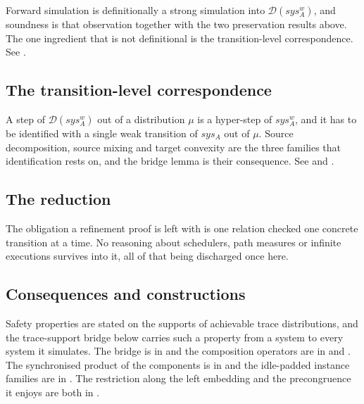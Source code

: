 Forward simulation is definitionally a strong simulation into $\mathcal{D}(sys_A^w)$, and soundness is that observation together with the two preservation results above.
The one ingredient that is not definitional is the transition-level correspondence.
See .

\subsection{The transition-level correspondence}

A step of $\mathcal{D}(sys_A^w)$ out of a distribution $\mu$ is a hyper-step of $sys_A^w$, and it has to be identified with a single weak transition of $sys_A$ out of $\mu$.
Source decomposition, source mixing and target convexity are the three families that identification rests on, and the bridge lemma is their consequence.
See  and .






\subsection{The reduction}

The obligation a refinement proof is left with is one relation checked one concrete transition at a time.
No reasoning about schedulers, path measures or infinite executions survives into it, all of that being discharged once here.




\subsection{Consequences and constructions}

Safety properties are stated on the supports of achievable trace distributions, and the trace-support bridge below carries such a property from a system to every system it simulates.
The bridge is in  and the composition operators are in  and .
The synchronised product of the components is in  and the idle-padded instance families are in .
The restriction along the left embedding and the precongruence it enjoys are both in .

